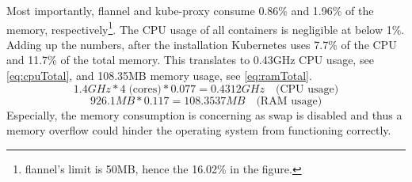 Most importantly, flannel and kube-proxy consume 0.86\% and 1.96\% of the memory, respectively\footnote{flannel's limit is 50MB, hence the 16.02\% in the figure.}. The CPU usage of all containers is negligible at below 1\%. Adding up the numbers, after the installation Kubernetes uses 7.7\% of the CPU and 11.7\% of the total memory. This translates to 0.43GHz CPU usage, see \cref{eq:cpuTotal}, and 108.35MB memory usage, see \cref{eq:ramTotal}.
\begin{equation} \label{eq:cpuTotal}
    1.4GHz * 4 \; \textrm{(cores)} * 0.077 = 0.4312GHz  \quad \textrm{(CPU usage)}
  \end{equation}
  \begin{equation} \label{eq:ramTotal}
    926.1MB * 0.117 = 108.3537MB  \quad \textrm{(RAM usage)}
  \end{equation}
Especially, the memory consumption is concerning as swap is disabled and thus a memory overflow could hinder the operating system from functioning correctly. 